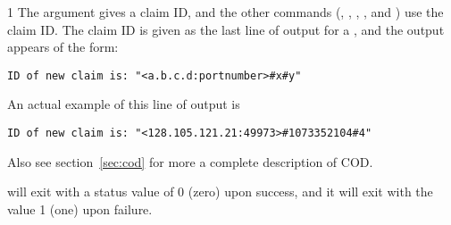 \begin{ManPage}{\label{man-condor-cod}}{1}
The  argument gives a claim ID, and the other 
commands (, , , ,
and ) use the claim ID.
The claim ID is given as the last line of output for a ,
and the output appears of the form:
\footnotesize
\begin{verbatim}
ID of new claim is: "<a.b.c.d:portnumber>#x#y"
\end{verbatim}
\normalsize
An actual example of this line of output is 
\footnotesize
\begin{verbatim}
ID of new claim is: "<128.105.121.21:49973>#1073352104#4"
\end{verbatim}
\normalsize

Also see
section~\ref{sec:cod}
for more a complete description of COD.

\begin{Options}
	\ToolArgsBaseDesc
	\ToolLocateDesc
\end{Options}

\GenRem

\Examples

\ExitStatus

 will exit with a status value of 0 (zero) upon success,
and it will exit with the value 1 (one) upon failure.

\end{ManPage}
